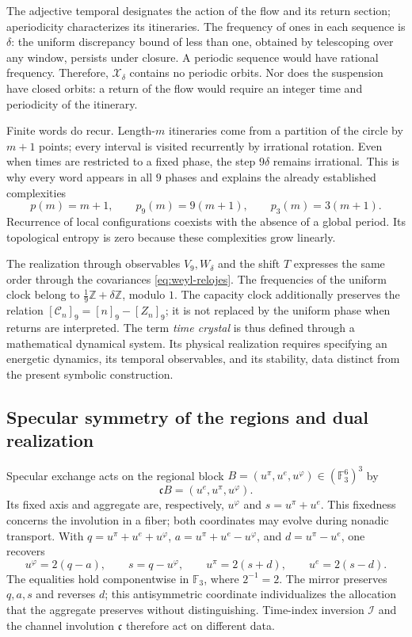The adjective temporal designates the action of the flow and its return section;
aperiodicity characterizes its itineraries. The frequency of ones in each
sequence is \(\delta\): the uniform discrepancy bound of less than one,
obtained by telescoping over any window, persists under closure.
A periodic sequence would have rational frequency. Therefore,
\(\mathcal X_\delta\) contains no periodic orbits. Nor does the suspension
have closed orbits: a return of the flow would require an integer
time and periodicity of the itinerary.

Finite words do recur. Length-\(m\) itineraries
come from a partition of the circle by \(m+1\) points; every
interval is visited recurrently by irrational rotation. Even
when times are restricted to a fixed phase, the step \(9\delta\) remains
irrational. This is why every word appears in all
\(9\) phases and explains the already established complexities
\[
 p(m)=m+1,\qquad p_9(m)=9(m+1),\qquad p_3(m)=3(m+1).
\]
Recurrence of local configurations coexists with the absence of a
global period. Its topological entropy is zero because these complexities
grow linearly.

The realization through observables \(V_9,W_\delta\) and the shift
\(T\) expresses the same order through the covariances
\eqref{eq:weyl-relojes}. The frequencies of the uniform clock belong to
\(\frac19\mathbb Z+\delta\mathbb Z\), modulo \(1\). The capacity
clock additionally preserves the relation
\([\mathcal C_n]_9=[n]_9-[Z_n]_9\); it is not replaced by the uniform phase
when returns are interpreted. The term \emph{time crystal} is thus
defined through a mathematical dynamical system. Its physical realization
requires specifying an energetic dynamics, its temporal observables,
and its stability, data distinct from the present symbolic construction.

\subsection{Specular symmetry of the regions and dual realization}
\label{mono-ampl:regiones}

Specular exchange acts on the regional block
\(B=(u^\pi,u^e,u^\varphi)\in(\mathbb F_3^6)^3\) by
\[
 \mathfrak cB=(u^e,u^\pi,u^\varphi).
\]
Its fixed axis and aggregate are, respectively, \(u^\varphi\) and
\(s=u^\pi+u^e\). This fixedness concerns the involution in a fiber;
both coordinates may evolve during nonadic transport.
With \(q=u^\pi+u^e+u^\varphi\),
\(a=u^\pi+u^e-u^\varphi\), and \(d=u^\pi-u^e\), one recovers
\[
 u^\varphi=2(q-a),\qquad s=q-u^\varphi,\qquad
 u^\pi=2(s+d),\qquad u^e=2(s-d).
\]
The equalities hold componentwise in \(\mathbb F_3\), where
\(2^{-1}=2\). The mirror preserves \(q,a,s\) and reverses \(d\); this
antisymmetric coordinate individualizes the allocation that the aggregate preserves
without distinguishing. Time-index inversion \(\mathcal I\) and the
channel involution \(\mathfrak c\) therefore act on
different data.

